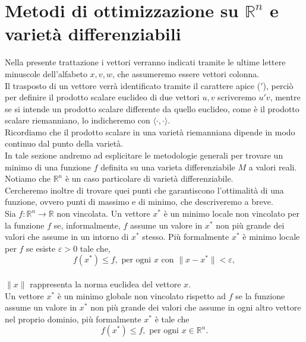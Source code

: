 \documentclass[a4paper, 12pt]{article}
\begin{document}
\section{Metodi di ottimizzazione su $\mathbb{R}^n$ e varietà differenziabili}
Nella presente trattazione i vettori verranno indicati tramite le ultime lettere minuscole dell'alfabeto $x, v, w$, che assumeremo essere vettori colonna.\\
Il trasposto di un vettore verrà identificato tramite il carattere apice ($'$), perciò per definire il prodotto scalare euclideo di due vettori $u, v$ scriveremo $u'v$, mentre se si intende  un prodotto scalare differente da quello euclideo, come è il prodotto scalare riemanniano, lo indicheremo con $\langle \cdot,\cdot \rangle$.\\
Ricordiamo che il prodotto scalare in una varietà riemanniana dipende in modo continuo dal punto della varietà.\\
In tale sezione andremo ad esplicitare le metodologie generali per trovare un minimo di una funzione $f$ definita su una varieta differenziabile $M$ a valori reali.\\
Notiamo che $\mathbb{R}^n$ è un caso particolare di varietà differenziabile.\\
Cercheremo inoltre di trovare quei punti che garantiscono l'ottimalità di una funzione, ovvero punti di massimo e di minimo, che descriveremo a breve.\\
Sia $f: \mathbb{R} ^n \to \mathbb{R}$ non vincolata.
Un vettore $x^\ast$ è un minimo locale non vincolato per la funzione $f$ se, informalmente, $f$ assume un valore in $x^\ast$ non più grande dei valori che assume in un intorno di $x^\ast$ stesso. Più formalmente $x^\ast$ è minimo locale per $f$ se esiste $\varepsilon > 0$ tale che,\\
\[f(x^\ast) \leq f, \mbox{ per ogni } x \mbox{ con } \| x - x^\ast \| < \varepsilon,\]\\
$\| x \|$ rappresenta la norma euclidea del vettore $x$.\\
Un vettore $x^\ast$ è un minimo globale non vincolato rispetto ad $f$ se la funzione assume un valore in $x^\ast$ non più grande dei valori che assume in ogni altro vettore nel proprio dominio, più formalmente $x^\ast$ è tale che\\
\[f(x^\ast) \leq f, \mbox{ per ogni } x \in \mathbb{R}^n.\]\\
\end{document}
